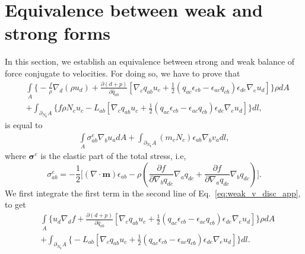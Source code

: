 \section{Equivalence between weak and strong forms} \label{equivalence}

In this section, we establish an equivalence between strong and weak balance of force conjugate to velocities. For doing so, we have to prove that
\begin{equation}
	\label{eq:weak_v_disc_app}
	\begin{aligned}
		&\underset{ A}{\int} \bigg \{-\frac{ f}{\rho} \nabla_d \left(\rho u_d\right)  + \frac{\partial ( d+ p)}{\partial \widehat{q}_{ab}}  \left[\nabla_c q_{ab} u_c +\frac{1}{2}\left(q_{ac} \epsilon_{cb}-\epsilon_{ac}q_{cb}\right) \epsilon_{de}\nabla_e u_d\right] \bigg \}\rho dA \\
		&+  \int_{\partial_{N_{\bm{t}}} A} \bigg\{f\rho N_c u_c - L_{ab} \left[\nabla_c q_{ab} u_c +\frac{1}{2}\left(q_{ac} \epsilon_{cb}-\epsilon_{ac}q_{cb}\right) \epsilon_{de}\nabla_e u_d\right] \bigg\}dl,
	\end{aligned}
\end{equation}
is equal to 
\begin{equation}
	\label{eq:weak_v_app}
	\begin{aligned}
		\underset{A}{\int} \sigma^e_{ab}\nabla_b u_a dA + \int_{\partial_{N_{\bm{t}}} A} ( m_c N_c)\epsilon_{ab} \nabla_b v_a dl,
	\end{aligned}
\end{equation}
where $\bm{\sigma}^e$ is the elastic part of the total stress, i.e, 
\begin{equation}
	\sigma_{ab}^e = -\frac{1}{2} \bigg[\left(\nabla\cdot\bm{m}\right)\epsilon_{ab} - \rho \left(\frac{\partial  f}{\partial \nabla_b q_{dc}} \nabla_a q_{dc}+ \frac{\partial  f}{\partial \nabla_a q_{dc}} \nabla_b q_{dc}\right) \bigg].
\end{equation}
We first integrate the first term in the second line of Eq.~\eqref{eq:weak_v_disc_app}, to get
\begin{equation}
	\label{eq:weak_v_disc_app2}
	\begin{aligned}
		&\underset{ A}{\int} \bigg \{  u_d \nabla_d f + \frac{\partial ( d+ p)}{\partial \widehat{q}_{ab}} \left[\nabla_c q_{ab} u_c +\frac{1}{2}\left(q_{ac} \epsilon_{cb}-\epsilon_{ac}q_{cb}\right) \epsilon_{de}\nabla_e u_d\right] \bigg \} \rho dA \\
		&+  \int_{\partial_{N_{\bm{t}}} A} \bigg\{ -L_{ab} \left[\nabla_c q_{ab} u_c +\frac{1}{2}\left(q_{ac} \epsilon_{cb}-\epsilon_{ac}q_{cb}\right) \epsilon_{de}\nabla_e u_d\right]  \bigg\}dl.
	\end{aligned}
\end{equation}
